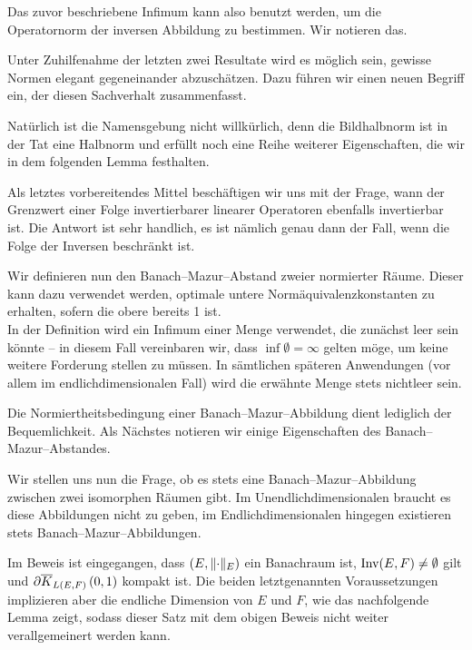 \documentclass[a4paper]{report}
\numberwithin[\roman]{equation}{sat}
\begin{document}

\parag
Das zuvor beschriebene Infimum kann also benutzt werden, um die Operatornorm
der inversen Abbildung zu bestimmen. Wir notieren das.


\parag
Unter Zuhilfenahme der letzten zwei Resultate wird es möglich sein, gewisse
Normen elegant gegeneinander abzuschätzen. Dazu führen wir einen neuen Begriff
ein, der diesen Sachverhalt zusammenfasst.



Natürlich ist die Namensgebung nicht willkürlich, denn die Bildhalbnorm ist
in der Tat eine Halbnorm und erfüllt noch eine Reihe weiterer Eigenschaften,
die wir in dem folgenden Lemma festhalten.


\parag
Als letztes vorbereitendes Mittel beschäftigen wir uns mit der Frage, wann der
Grenzwert einer Folge invertierbarer linearer Operatoren ebenfalls invertierbar
ist. Die Antwort ist sehr handlich, es ist nämlich genau dann der Fall, wenn
die Folge der Inversen beschränkt ist.


\parag
Wir definieren nun den Banach--Mazur--Abstand zweier normierter Räume. Dieser
kann dazu verwendet werden, optimale untere Normäquivalenzkonstanten zu
erhalten, sofern die obere bereits 1 ist.\\
In der Definition wird ein Infimum einer Menge verwendet, die zunächst leer
sein könnte -- in diesem Fall vereinbaren wir, dass $\inf \emptyset = \infty$
gelten möge, um keine weitere Forderung stellen zu müssen.
In sämtlichen späteren Anwendungen (vor allem im endlichdimensionalen Fall) wird die erwähnte Menge stets nichtleer sein.


\parag
Die Normiertheitsbedingung einer Banach--Mazur--Abbildung dient lediglich der
Bequemlichkeit.
Als Nächstes notieren wir einige Eigenschaften des
Banach--Mazur--Abstandes.



Wir stellen uns nun die Frage, ob es stets eine Banach--Mazur--Abbildung
zwischen zwei isomorphen Räumen gibt.
Im Unendlichdimensionalen braucht es
diese Abbildungen nicht zu geben, im Endlichdimensionalen hingegen existieren
stets Banach--Mazur--Abbildungen.


\parag
Im Beweis ist eingegangen, dass $(E, \lVert\cdot\rVert_E)$
ein Banachraum ist, $\mathop{\textrm{Inv}}\nolimits(E, F)\neq \emptyset$ gilt und $\partial \overline K_{L(E,F)}\left(0, 1\right)$
kompakt ist.
Die beiden letztgenannten Voraussetzungen implizieren aber die
endliche Dimension von $E$ und $F$, wie das nachfolgende Lemma zeigt, sodass
dieser Satz mit dem obigen Beweis nicht weiter verallgemeinert werden kann.
\end{document}
